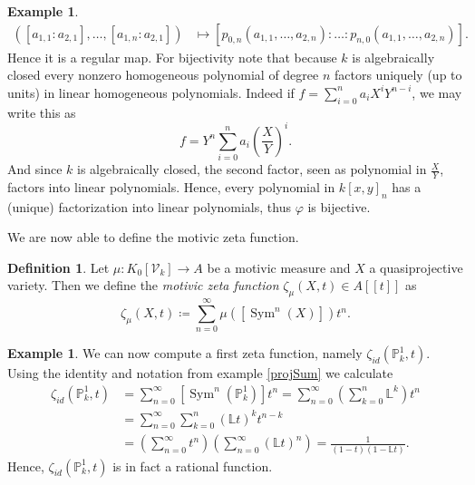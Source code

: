 \documentclass[11pt, a4paper, english, twoside]{article}
\theoremstyle{plain}
\theoremstyle{definition}
\newtheorem{definition}[theorem]{Definition}
\newtheorem{example}[theorem]{Example}
\newcommand{\gring}[1][k]{K_0[\mathcal{V}_#1]}
\DeclareMathOperator{\Sym}{Sym}
\begin{document}
\begin{example}
\begin{align*}
        ([a_{1,1}:a_{2,1}],\dots,[a_{1,n}:a_{2,1}]) &\mapsto [p_{0,n}(a_{1,1},\dots, a_{2,n}):\dots:p_{n,0}(a_{1,1},\dots, a_{2,n})].
    \end{align*}
    Hence it is a regular map.
    For bijectivity note that because $k$ is algebraically closed every nonzero homogeneous polynomial of degree $n$ factors uniquely (up to
    units) in linear homogeneous polynomials.
    Indeed if $f = \sum_{i=0}^n a_iX^iY^{n-i}$, we may write this as
    \[
        f = Y^n \sum_{i=0}^n a_i\left(\frac{X}{Y}\right)^i.
    \]
    And since $k$ is algebraically closed, the second factor, seen as polynomial in $\frac{X}{Y}$, factors into linear polynomials.
    Hence, every polynomial in $k[x,y]_n$ has a (unique) factorization into linear polynomials, thus $\varphi$ is bijective.
\end{example}

We are now able to define the motivic zeta function.

\begin{definition}
    Let $\mu \colon \gring \to A$ be a motivic measure and $X$ a quasiprojective variety. Then we define the \emph{motivic zeta function} 
    $\zeta_{\mu}(X,t) \in A[[t]]$ as
    \[
        \zeta_{\mu}(X,t) \coloneqq \sum_{n=0}^\infty \mu([\Sym^n(X)])t^n.
    \]
\end{definition}

\begin{example}
    We can now compute a first zeta function, namely $\zeta_{id}(\mathbb{P}_k^1, t)$. Using the identity and notation from example \ref{projSum}
    we calculate
    \begin{align*}
        \zeta_{id}(\mathbb{P}_k^1, t) & = \sum_{n=0}^\infty \left[\Sym^n({\mathbb{P}_k^1})\right]t^n 
                                       = \sum_{n=0}^\infty \left(\sum_{k=0}^n \mathbb{L}^k\right) t^n \\
                                       & = \sum_{n=0}^\infty \sum_{k=0}^n \left(\mathbb{L}t\right)^k t^{n-k} \\
                                      & = \left( \sum_{n=0}^\infty t^n \right) \left( \sum_{n=0}^\infty (\mathbb{L}t)^n \right) 
                                        = \frac{1}{(1-t)(1-\mathbb{L}t)} .
    \end{align*}
    Hence, $\zeta_{id}(\mathbb{P}_k^1, t)$ is in fact a rational function.
\end{example}
\end{document}
